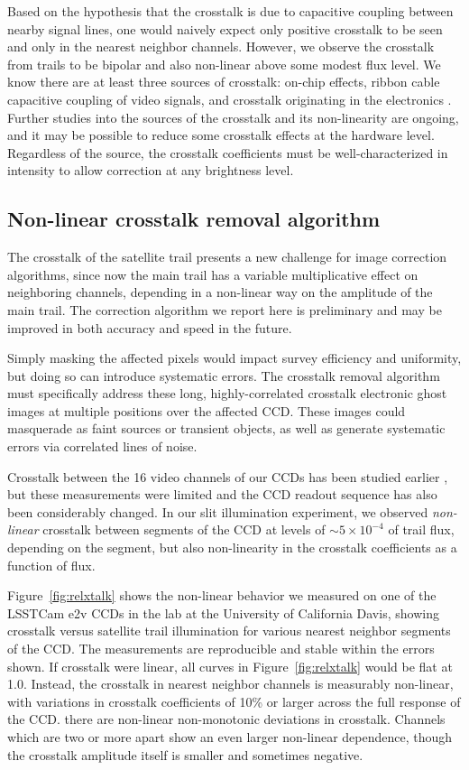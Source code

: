 \documentclass[twocolumn,trackchanges]{aastex63}
\begin{document}
Based on the hypothesis that the crosstalk is due to capacitive coupling between nearby signal lines, one would naively expect only positive crosstalk to be seen and only in the nearest neighbor channels. However, we observe the crosstalk from trails to be bipolar and also non-linear above some modest flux level. We know there are at least three sources of crosstalk: on-chip effects, ribbon cable capacitive coupling of video signals, and crosstalk originating in the electronics \citep{Antilogus_2017}. Further studies into the sources of the crosstalk and its non-linearity are ongoing, and it may be possible to reduce some crosstalk effects at the hardware level. Regardless of the source, the crosstalk coefficients must be well-characterized in intensity to allow correction at any brightness level. 


\subsection{Non-linear crosstalk removal algorithm}
\label{subsec:crosstalk}
The crosstalk of the satellite trail presents a new challenge for image correction algorithms, since now the main trail has a variable multiplicative effect on neighboring channels, depending in a non-linear way on the amplitude of the main trail. The correction algorithm we report here is preliminary and may be improved in both accuracy and speed in the future. 

Simply masking the affected pixels would impact survey efficiency and uniformity, but doing so can introduce systematic errors. The crosstalk removal algorithm must specifically address these long, highly-correlated crosstalk electronic ghost images at multiple positions over the affected CCD. These images could masquerade as faint sources or transient objects, as well as generate systematic errors via correlated lines of noise.

Crosstalk between the 16 video channels of our CCDs has been studied earlier \citep{O_Connor_2015}, but these measurements were limited and the CCD readout sequence has also been considerably changed. In our slit illumination experiment, we observed {\it non-linear} crosstalk between segments of the CCD at levels of $\sim5 \times 10^{-4}$ of trail flux, depending on the segment, but also non-linearity in the crosstalk coefficients as a function of flux.

Figure~\ref{fig:relxtalk} shows the non-linear behavior we  measured on one of the LSSTCam e2v CCDs in the lab at the University of California Davis, showing crosstalk versus satellite trail illumination for various nearest neighbor segments of the CCD. The measurements are reproducible and stable within the errors shown. If crosstalk were linear, all curves in Figure~\ref{fig:relxtalk} would be flat at 1.0. Instead, the crosstalk in nearest neighbor channels is measurably non-linear, with variations in crosstalk coefficients of 10\% or larger across the full response of the CCD.  
there are non-linear non-monotonic deviations in crosstalk.   Channels which are two or more apart show an even larger non-linear dependence, though the crosstalk amplitude itself is smaller and sometimes negative.
\end{document}
